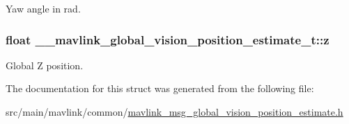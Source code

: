 Yaw angle in rad. 

\hypertarget{struct____mavlink__global__vision__position__estimate__t_ab7cb6c5e88d406ac8566580d0c4003ee}{
\subsubsection[{z}]{\setlength{\rightskip}{0pt plus 5cm}float \+\_\+\+\_\+mavlink\+\_\+global\+\_\+vision\+\_\+position\+\_\+estimate\+\_\+t\+::z}}\label{struct____mavlink__global__vision__position__estimate__t_ab7cb6c5e88d406ac8566580d0c4003ee}


Global Z position. 



The documentation for this struct was generated from the following file\+:\begin{DoxyCompactItemize}
\item 
src/main/mavlink/common/\hyperlink{mavlink__msg__global__vision__position__estimate_8h}{mavlink\+\_\+msg\+\_\+global\+\_\+vision\+\_\+position\+\_\+estimate.\+h}\end{DoxyCompactItemize}
